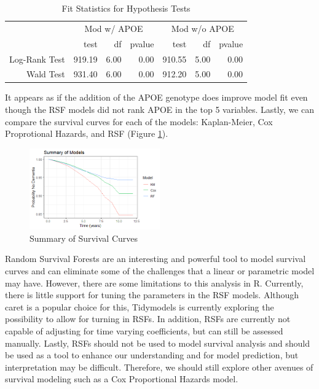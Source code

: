 \documentclass[a4paper,man,natbib,11pt]{article}
\begin{document}
\begin{table}[h!]
\centering
\caption{Fit Statistics for Hypothesis Tests}
\begin{tabular}{rrrrrrr}
\toprule
& \multicolumn{3}{c}{Mod w/ APOE} & \multicolumn{3}{c}{Mod w/o APOE} \\
  \cmidrule(r){2-4}\cmidrule(l){5-7}
 & test & df & pvalue & test & df & pvalue \\ 
  \midrule
Log-Rank Test & 919.19 & 6.00 & 0.00 & 910.55 & 5.00 & 0.00 \\ 
  Wald Test & 931.40 & 6.00 & 0.00 & 912.20 & 5.00 & 0.00 \\ 
   \bottomrule
\end{tabular}
\label{GOF}
\end{table}


It appears as if the addition of the APOE genotype does improve model fit even though the RSF models did not rank APOE in the top 5 variables. Lastly, we can compare the survival curves for each of the models: Kaplan-Meier, Cox Proprotional Hazards, and RSF (Figure \ref{fig:all_curves}). 

\begin{figure}[h!]%
    \centering
    \includegraphics[width=0.5\textwidth]{figures/Summary_curves.png}
    \caption{Summary of Survival Curves}%
    \label{fig:all_curves}%
\end{figure}

Random Survival Forests are an interesting and powerful tool to model survival curves and can eliminate some of the challenges that a linear or parametric model may have. However, there are some limitations to this analysis in R. Currently, there is little support for tuning the parameters in the RSF models. Although caret is a popular choice for this, Tidymodels is currently exploring the possibility to allow for turning in RSFs. In addition, RSFs are currently not capable of adjusting for time varying coefficients, but can still be assessed manually. Lastly, RSFs should not be used to model survival analysis and should be used as a tool to enhance our understanding and for model prediction, but interpretation may be difficult. Therefore, we should still explore other avenues of survival modeling such as a Cox Proportional Hazards model.
\end{document}
